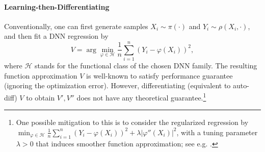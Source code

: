 \documentclass[twoside,11pt]{article}
\newcommand{\1}{\mathbf{1}}
\numberwithin{equation}{section}
\begin{document}
\paragraph{Learning-then-Differentiating} Conventionally, one can first generate samples $X_i \sim \pi(\cdot)$ and $Y_i \sim \rho(X_i,\cdot)$, and then fit a DNN regression by
\[ V = \arg\min_{\varphi\in \mathcal H} \frac{1}{n}\sum_{i=1}^n \left( Y_i - \varphi(X_i) \right)^2, \]
where $\mathcal H$ stands for the functional class of the chosen DNN family. The resulting function approximation $V$ is well-known to satisfy performance guarantee (ignoring the optimization error).
However, differentiating (equivalent to auto-diff) $V$ to obtain $V',V''$ does not have any theoretical guarantee.\footnote{One possible mitigation to this is to consider the regularized regression by
$\min_{\varphi\in \mathcal H} \frac{1}{n}\sum_{i=1}^n \left( Y_i - \varphi(X_i) \right)^2 + \lambda |\varphi''(X_i)|^2 $, with a tuning parameter $\lambda > 0$ that induces smoother function approximation; see e.g. \cite{wahba1990spline}.
}
\end{document}
